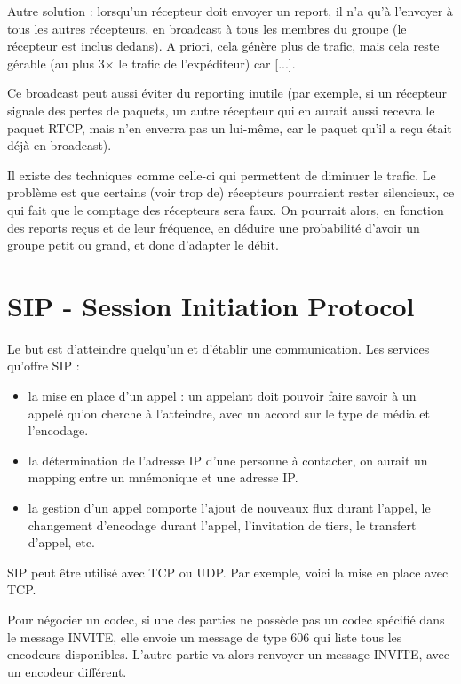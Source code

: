 		 Autre solution : lorsqu'un récepteur doit envoyer un report, il n'a qu'à l'envoyer à tous les autres récepteurs, en broadcast à tous les membres du groupe (le récepteur est inclus dedans). A priori, cela génère plus de trafic, mais cela reste gérable (au plus 3$\times$ le trafic de l'expéditeur) car [...].
		 
		 Ce broadcast peut aussi éviter du reporting inutile (par exemple, si un récepteur signale des pertes de paquets, un autre récepteur qui en aurait aussi recevra le paquet RTCP, mais n'en enverra pas un lui-même, car le paquet qu'il a reçu était déjà en broadcast).
		 
		 Il existe des techniques comme celle-ci qui permettent de diminuer le trafic. Le problème est que certains (voir trop de) récepteurs pourraient rester silencieux, ce qui fait que le comptage des récepteurs sera faux. On pourrait alors, en fonction des reports reçus et de leur fréquence, en déduire une probabilité d'avoir un groupe petit ou grand, et donc d'adapter le débit.
		 
		\section{SIP - Session Initiation Protocol}
		
		Le but est d'atteindre quelqu'un et d'établir une communication. Les services qu'offre SIP :
		
		\begin{itemize}
			\item la mise en place d'un appel : un appelant doit pouvoir faire savoir à un appelé qu'on cherche à l'atteindre, avec un accord sur le type de média et l'encodage.
			\item la détermination de l'adresse IP d'une personne à contacter, on aurait un mapping entre un mnémonique et une adresse IP.
			\item la gestion d'un appel comporte l'ajout de nouveaux flux durant l'appel, le changement d'encodage durant l'appel, l'invitation de tiers, le transfert d'appel, etc.
		\end{itemize}
	
		SIP peut être utilisé avec TCP ou UDP. Par exemple, voici la mise en place avec TCP.	
		
		Pour négocier un codec, si une des parties ne possède pas un codec spécifié dans le message INVITE, elle envoie un message de type 606 qui liste tous les encodeurs disponibles. L'autre partie va alors renvoyer un message INVITE, avec un encodeur différent.
		
